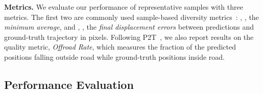 \documentclass[10pt,twocolumn,letterpaper]{article}
\begin{document}
\textbf{Metrics. } We evaluate our performance of representative samples with three metrics. The first two are commonly used sample-based diversity metrics~\cite{gupta2018social}: , \ie, the \textit{minimum average}, and , \ie, the \textit{final displacement errors} between  predictions and ground-truth trajectory in pixels. Following P2T~\cite{deo2020trajectory}, we also report results on the quality metric, \textit{Offroad Rate}, which measures the fraction of the predicted positions falling outside road while ground-truth positions inside road. 

\begin{table}
    \centering
{}
	\vspace{-0.2cm}
	\caption{Comparison with state-of-the-art methods on the entire SDD dataset (above) and its \textit{TrajNet} split (below) in predicting short-term 4.8-second future.}

	\label{tab:result}
\end{table}


\subsection{Performance Evaluation}
\end{document}
